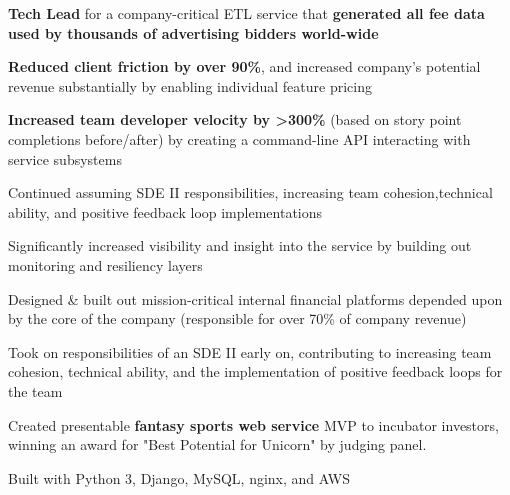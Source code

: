 \documentclass[]{two-column-resume}
\begin{document}
\begin{minipage}[t]{0.65\textwidth}
\begin{tightemize}
\item \textbf{Tech Lead} for a company-critical ETL service that \textbf{generated all fee data used by thousands of advertising bidders world-wide}
\item \textbf{Reduced client friction by over 90\%}, and increased
company's potential revenue substantially by enabling individual feature pricing
\item {\bf Increased team developer velocity by >300\%} (based on story point
completions before/after) by creating a command-line API interacting
with service subsystems
\item Continued assuming SDE II responsibilities, increasing team cohesion,technical ability, and positive feedback loop implementations
\item Significantly increased visibility and insight into the service by building out monitoring and resiliency layers
\end{tightemize}
\sectionsep


\vspace{\topsep} %

\begin{tightemize}
\item Designed \& built out mission-critical internal financial platforms depended upon by the core of the company (responsible for over 70\% of company revenue)
\item Took on responsibilities of an SDE II early on, contributing to increasing team cohesion, technical ability, and the implementation of positive feedback loops for the team
\end{tightemize}
\sectionsep


\vspace{0.9em} %

\begin{tightemize}
\item Created presentable {\bf fantasy sports web service} MVP to
incubator investors, winning an award for "Best Potential for Unicorn"
by judging panel.
\item Built with Python 3, Django, MySQL, nginx, and AWS
\end{tightemize}
\sectionsep


\end{minipage}
\end{document}
